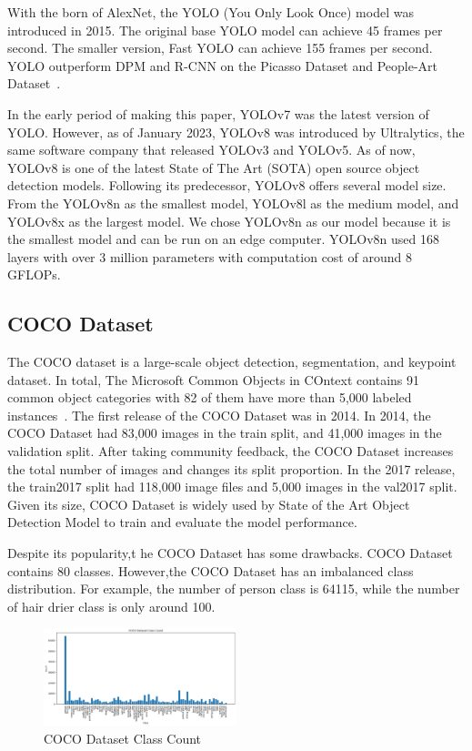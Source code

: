 \documentclass[conference]{IEEEtran}
\begin{document}
With the born of AlexNet, the YOLO (You Only Look Once) model was introduced in 2015. The original base YOLO model can achieve 45 frames per second.
The smaller version, Fast YOLO can achieve 155 frames per second.
YOLO outperform DPM and R-CNN on the Picasso Dataset and People-Art Dataset~\cite{You Only Look Once}.

In the early period of making this paper, YOLOv7 was the latest version of YOLO\@.
However, as of January 2023, YOLOv8 was introduced by Ultralytics, the same software company that released YOLOv3 and YOLOv5. 
As of now, YOLOv8 is one of the latest State of The Art (SOTA) open source object detection models. Following its predecessor, YOLOv8 offers several model size.
From the YOLOv8n as the smallest model, YOLOv8l as the medium model, and YOLOv8x as the largest model.
We chose YOLOv8n as our model because it is the smallest model and can be run on an edge computer.
YOLOv8n used 168 layers with over 3 million parameters with computation cost of around 8 GFLOPs.
\subsection{COCO Dataset}\label{AA}
The COCO dataset is a large-scale object detection, segmentation, and keypoint dataset.
In total, The Microsoft Common Objects in COntext contains 91 common object categories with 82 of them have more than 5,000 labeled instances~\cite{COCO Dataset}.
The first release of the COCO Dataset was in 2014. In 2014, the COCO Dataset had 83,000 images in the  train split, and 41,000 images in the validation split.
After taking community feedback, the COCO Dataset increases the total number of images and changes its split proportion. In the 2017 release, the train2017 split had 118,000 image files and 5,000 images in the val2017 split.
Given its size, COCO Dataset is widely used by State of the Art Object Detection Model to train and evaluate the model performance.

Despite its popularity,t
he COCO Dataset has some drawbacks. COCO Dataset contains 80 classes. However,the COCO Dataset has an imbalanced class distribution.
For example, the number of person class is 64115, while the number of hair drier class is only around 100.
\begin{figure}[h]
\centering
\includegraphics[width=0.5\textwidth,keepaspectratio]{coco_class_count.png}
\caption{COCO Dataset Class Count}
\end{figure}
\end{document}
